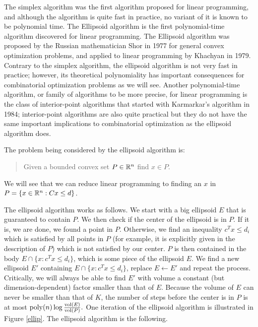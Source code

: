 \documentclass[12pt]{article}
\begin{document}

The simplex algorithm was the first algorithm proposed for linear
programming, and although the algorithm is quite fast in practice, no
variant of it is known to be polynomial time. The Ellipsoid algorithm
is the first polynomial-time algorithm discovered for linear
programming. The Ellipsoid algorithm was proposed by the Russian mathematician
Shor in 1977 for general convex optimization problems, and applied to
linear programming  by Khachyan in 1979. Contrary to the simplex
algorithm, the ellipsoid algorithm is not very fast in practice;
however, its theoretical polynomiality has important consequences for
combinatorial optimization problems as we will see. Another
polynomial-time algorithm, or family of algorithms to be more precise,
for linear programming is the class of interior-point algorithms that
started with Karmarkar's algorithm in 1984; interior-point algorithms
are also quite practical but they do not have the same important
implications to combinatorial optimization as the ellipsoid algorithm
does. 

The problem being considered by the ellipsoid algorithm is:
\begin{quote}
Given a bounded convex set $P\in {\mathbb R}^{n}$ find $x \in P$. 
\end{quote}

We will see that we can reduce linear programming  to finding an $x$
	in $P=\{x\in {\mathbb R}^{n} : Cx \leq d\}$.

The ellipsoid algorithm works as follows. We start with a big
ellipsoid $E$ that is guaranteed to contain $P$. We then check if the
center of the ellipsoid is in $P$. If it is, we are done, we found a
point in $P$. Otherwise, we find an inequality $c^Tx \leq d_i$ which
is satisfied by all points in $P$ (for example, it is explicitly given
in the description of $P$) which is not satisfied by our center. $P$ is then contained in the body $E \cap \{x: c^Tx \leq d_i\}$, which is some piece of the ellipsoid $E$. We find a new ellipsoid $E'$ containing $E \cap \{x: c^Tx \leq d_i\}$, replace $E \leftarrow E'$ and repeat the process. Critically, we will always be able to find $E'$ with volume a constant (but dimension-dependent) factor smaller than that of $E$. Because the volume of $E$ can never be smaller than that of $K$, the number of steps before the center is in $P$ is at most $\operatorname{poly}(n)\log \frac{\operatorname{vol}(E)}{\operatorname{vol}(P)}.$
One iteration of the ellipsoid algorithm is illustrated in Figure
\ref{ellip}. The ellipsoid algorithm is the following. 
\end{document}
